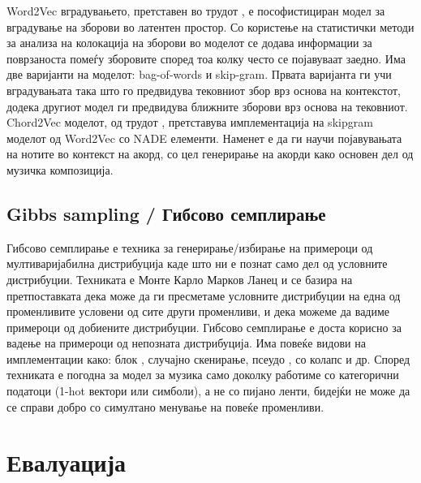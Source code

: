 Word2Vec вградувањето, претставен во трудот \cite{Mikolov2013}, е пософистициран модел за вградување на зборови во латентен простор. Со користење на статистички методи за анализа на колокација на зборови во моделот се додава информации за поврзаноста помеѓу зборовите според тоа колку често се појавуваат заедно. Има две варијанти на моделот: bag-of-words и skip-gram. Првата варијанта ги учи вградувањата така што го предвидува тековниот збор врз основа на контекстот, додека другиот модел ги предвидува ближните зборови врз основа на тековниот. 
Chord2Vec моделот, од трудот \cite{Madjiheurem2016}, претставува имплементација на skipgram моделот од Word2Vec со NADE елементи. Наменет е да ги научи појавувањата на нотите во контекст на акорд, со цел генерирање на акорди како основен дел од музичка композиција. 

\section{Gibbs sampling / Гибсово семплирање}

Гибсово семплирање е техника за генерирање/избирање на примероци од мултиваријабилна дистрибуција каде што ни е познат само дел од условните дистрибуции. Техниката е Монте Карло Марков Ланец и се базира на претпоставката дека може да ги пресметаме условните дистрибуции на една од променливите условени од сите други променливи, и дека можеме да вадиме примероци од добиените дистрибуции. Гибсово семплирање е доста корисно за вадење на примероци од непозната дистрибуција. Има повеќе видови на имплементации како: блок \cite{Boulanger-Lewandowski2012, Goel2014}, случајно скенирање, псеудо \cite{Hadjeres2016}, со колапс и др. Според \cite{Hadjeres2016} техниката е погодна за модел за музика само доколку работиме со категорични податоци (1-hot вектори или симболи), а не со пијано ленти, бидејќи не може да се справи добро со симултано менување на повеќе променливи.

\chapter{Евалуација}
\label{ch:evaluacija}

